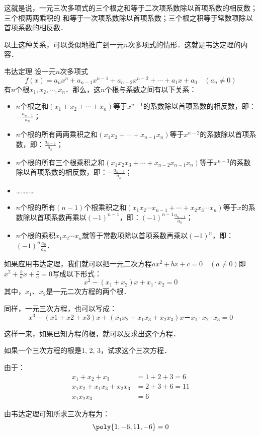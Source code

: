 这就是说，一元三次多项式的三个根之和等于二次项系数除以首项系数的相反数；三个根两两乘积的
和等于一次项系数除以首项系数；三个根之积等于常数项除以首项系数的相反数．

以上这种关系，可以类似地推广到一元$n$次多项式的情形．这就是韦达定理的内容．

\begin{blk}{韦达定理}
设一元$n$次多项式$$f(x)=a_nx^n+a_{n-1}x^{n-1}+a_{n-2}x^{n-2}+\cdots+a_1x+a_0\quad (a_n\ne 0)$$
有$n$个根$x_1,x_2,\cdots,x_n$．那么，这$n$个根与系数之间有以下关系：
\begin{itemize}
    \item $n$个根之和$(x_1+x_2+\cdots+x_n)$等于$x^{n-1}$的系数除以首项系数的相反数，即：$
    -\frac{a_{n-1}}{a_n}$；
    \item $n$个根的所有两两乘积之和$(x_1x_2+\cdots+x_{n-1}x_n)$等于$x^{n-2}$的系数除以首项系数，即：$
    \frac{a_{n-2}}{a_n}$；
    \item $n$个根的所有三个根乘积之和$(x_1x_2x_3+\cdots+x_{n-2}x_{n-1}x_n)$等于$x^{n-3}$的系数除以首项系数的相反数，即：$-\frac{a_{n-3}}{a_n}$；
    \item …………
    \item $n$个根的所有$(n-1)$个根乘积之和$(x_1x_2\cdots x_{n-1} +\cdots+ x_2x_3\cdots x_n)$等于$x$的系数除以首项系数再乘以$(-1)^{n-1}$，即：$ (-1)^{n-1}\frac{a_{n-1}}{a_n}$；
    \item $n$个根的乘积$x_1x_2\cdots x_n$就等于常数项除以首项系数再乘以$(-1)^{n}$，即：$ (-1)^{n}\frac{a_{0}}{a_n}$．
\end{itemize}
\end{blk}

如果应用韦达定理，我们就可以把一元二次方程$ax^2+bx+c=0\quad (a\ne 0)$即 $x^2+\frac{b}{a}x+\frac{c}{a}=0$写成以下形式：
\[x^2- (x_1+x_2) x+x_1\cdot x_2=0\]
其中，$x_1$、$x_2$是一元二次方程的两个根．

同样，一元三次方程，也可以写成：
\[x^3- (x1+x2+x3) x+ (x_1x_2+x_1x_3+x_2x_3) x
－x_1\cdot x_2\cdot x_3=0\]

这样一来，如果已知方程的根，就可以反求出这个方程．

\begin{example}
    如果一个三次方程的根是1, 2, 3，试求这个三次方程．
\end{example}

\begin{solution}
由于：\[\begin{split}
    x_1+x_2+x_3 &=1+2+3=6\\
    x_1x_2+x_1x_3+x_2x_3&=2+3+6=11\\
    x_1x_2x_3&=6
\end{split}\]

由韦达定理可知所求三次方程为：
\[\poly{1,-6,11,-6}=0\]
\end{solution}

